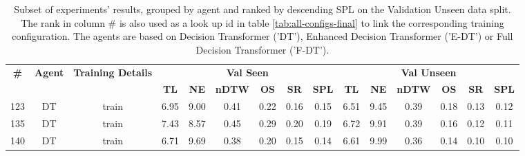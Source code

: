 \begin{table}
\centering
\caption{\label{tab:normalized_visual_features}Subset of experiments' results, grouped by agent and ranked by descending SPL on the Validation Unseen data split. The rank in column \# is also used as a look up id in table \ref{tab:all-configs-final} to link the corresponding training configuration.     \newline The agents are based on Decision Transformer ('DT'), Enhanced Decision Transformer ('E-DT') or Full Decision Transformer ('F-DT').}
\begin{tabular}{@{\hskip3pt}c@{\hskip3pt}c@{\hskip3pt}c@{\hskip3pt}c@{\hskip3pt}c@{\hskip3pt}c@{\hskip3pt}c@{\hskip3pt}c@{\hskip3pt}c@{\hskip3pt}c@{\hskip3pt}c@{\hskip3pt}c@{\hskip3pt}c@{\hskip3pt}c@{\hskip3pt}c}
\toprule
\textbf{\#} & \textbf{Agent} & \textbf{Training Details} & \multicolumn{6}{c}{\textbf{Val Seen}} & \multicolumn{6}{c}{\textbf{Val Unseen}} \\
 \textbf{~} &     \textbf{~} &                \textbf{~} &       \textbf{TL} & \textbf{NE} & \textbf{nDTW} & \textbf{OS} & \textbf{SR} & \textbf{SPL} &         \textbf{TL} & \textbf{NE} & \textbf{nDTW} & \textbf{OS} & \textbf{SR} & \textbf{SPL} \\
\midrule
        123 &             DT &                     train &              6.95 &        9.00 &          0.41 &        0.22 &        0.16 &         0.15 &                6.51 &        9.45 &          0.39 &        0.18 &        0.13 &         0.12 \\
        135 &             DT &                     train &              7.43 &        8.57 &          0.45 &        0.29 &        0.20 &         0.19 &                6.72 &        9.91 &          0.39 &        0.16 &        0.12 &         0.11 \\
        140 &             DT &                     train &              6.71 &        9.69 &          0.38 &        0.20 &        0.15 &         0.14 &                6.61 &        9.99 &          0.36 &        0.14 &        0.10 &         0.10 \\
\bottomrule
\end{tabular}
\end{table}
